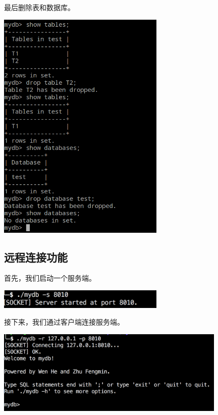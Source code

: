 \documentclass[11pt, a4paper]{article}
\makeatletter
\newcommand\fcaption{\def\@captype{figure}\caption}
\makeatother
\begin{document}
最后删除表和数据库。

\begin{center}
    \includegraphics[width=8cm]{fig/drop-db}
    \fcaption{删除表及数据库}
\end{center}

\subsection{远程连接功能}

首先，我们启动一个服务端。

\begin{center}
    \includegraphics[width=8cm]{fig/server}
    \fcaption{启动服务端}
\end{center}

接下来，我们通过客户端连接服务端。

\begin{center}
    \includegraphics[width=11cm]{fig/conn}
    \fcaption{客户端连接服务端}
\end{center}
\end{document}

